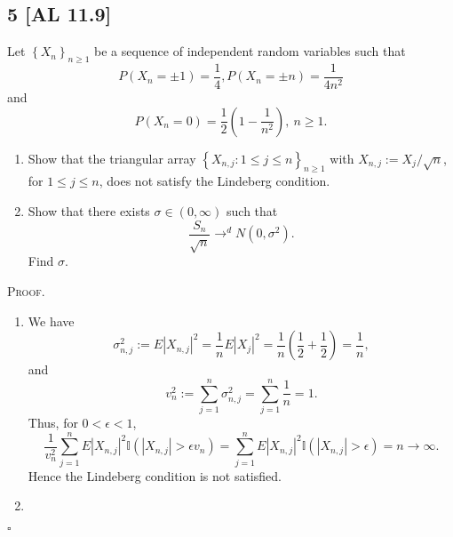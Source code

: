 \documentclass[12pt]{article}
\newcounter{ProofCounter}
\newenvironment{Proof}{\stepcounter{ProofCounter}\textsc{Proof.}}{\hfill$\square$}
\begin{document}
\subsection*{5 [AL 11.9]}
\begin{tcolorbox}
  Let $\left\{ X_n \right\}_{n\geq 1}$ be a sequence of independent random variables such that 
  \[ P(X_{n} = \pm 1) = \frac{1}{4}, P(X_{n} = \pm n) = \frac{1}{4n^{2}} \]
  and 
  \[ P(X_{n} = 0) = \frac{1}{2}\left( 1 - \frac{1}{n^{2}} \right), \ n \geq 1. \]
  \begin{enumerate}[label = (\alph*)]
    \item Show that the triangular array $\left\{ X_{n,j} : 1 \leq j \leq n \right\}_{n\geq 1}$ with $X_{n,j} := X_{j}/\sqrt{n}$, for $1 \leq j \leq
      n$, does not satisfy the Lindeberg condition.
    \item Show that there exists $\sigma \in (0,\infty)$ such that 
      \[ \frac{S_n}{\sqrt{n}} \rightarrow^{d}N(0,\sigma^{2}). \]
      Find $\sigma$.
  \end{enumerate}
\end{tcolorbox}
\begin{Proof}
  \begin{enumerate}[label = (\alph*)]
    \item We have 
      \[ \sigma_{n,j}^{2} := E|X_{n,j}|^{2} = \frac{1}{n}E|X_{j}|^{2} = \frac{1}{n}\left( \frac{1}{2} + \frac{1}{2} \right) = \frac{1}{n}, \]
      and 
      \[ v_{n}^{2} := \sum_{j=1}^{n}\sigma_{n,j}^{2} = \sum_{j=1}^{n}\frac{1}{n} = 1. \]
      Thus, for $0 < \epsilon < 1$,
      \[ 
        \frac{1}{v_{n}^{2}}\sum_{j=1}^{n}E|X_{n,j}|^{2}\mathbb{I} (|X_{n,j}| > \epsilon v_{n}) = \sum_{j=1}^{n}E|X_{n,j}|^{2}\mathbb{I} (|X_{n,j}| >
        \epsilon) = n \rightarrow \infty. 
      \]
      Hence the Lindeberg condition is not satisfied.
    \item 
  \end{enumerate}
\end{Proof}



\newpage
\end{document}
